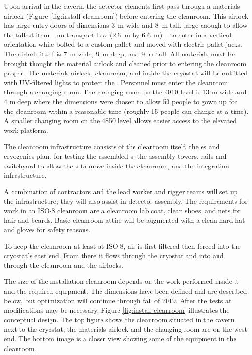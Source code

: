 Upon arrival in the cavern, the detector elements first pass through a materials airlock (Figure~\ref{fig:install-cleanroom}) before entering the cleanroom. This airlock has large entry doors of dimensions \SI{3}{m} wide and \SI{8}{m} tall, large enough to allow the tallest item -- an  transport box (\SI{2.6}{m} by \SI{6.6}{m}) -- to enter in a vertical orientation while bolted to a custom pallet and moved with electric pallet jacks. 
The airlock itself is \SI{7}{m} wide, \SI{9}{m} deep, and \SI{9}{m} tall. All materials must be brought thought the material airlock and cleaned prior to entering the cleanroom proper. 
The materials airlock, cleanroom, and inside the cryostat will be outfitted with UV-filtered lights to protect the . 
Personnel must enter the cleanroom through a changing room. The changing room on the 4910 level is 13 \si{m} wide and 4 \si{m} deep where the dimensions were chosen to allow 50 people to gown up for the cleanroom within a reasonable time (roughly 15 people can change at a time). A smaller changing room on the 4850 level allows easier access to the elevated work platform.


The cleanroom infrastructure consists of the cleanroom itself, the \coldbox{}es and cryogenics plant for testing the assembled s, the assembly towers, rails and switchyard to allow the s to move inside the cleanroom, and the  integration infrastructure. 

A combination of contractors and the lead worker and rigger teams will set up the infrastructure;  they will also assist in detector assembly. 
The requirements for work in an ISO-8 cleanroom are a cleanroom lab coat, clean shoes, and nets for hair and beards.  Basic cleanroom attire will be augmented with a clean hard hat and gloves for safety reasons. 

To keep the cleanroom at least at ISO-8, air is first filtered then forced into the cryostat's east end. 
From there it flows through the cryostat and into and through the cleanroom and the airlocks. 


The size of the installation cleanroom depends on the work performed inside it and the required equipment. The dimensions have been defined and are described below, but optimization will continue through fall of 2019.
After the tests at  modifications may be necessary. 
Figure \ref{fig:install-cleanroom} illustrates  the conceptual design. The top figure shows the cleanroom situated in the cavern next to the cryostat; the materials airlock and the changing room are on the west end. The bottom image is a closer view showing some of the equipment in the cleanroom. 

